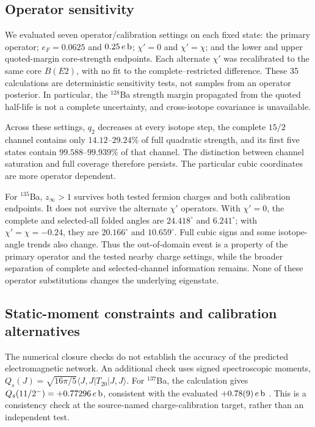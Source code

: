 \subsection{Operator sensitivity}

We evaluated seven operator/calibration settings on each fixed state: the primary operator; $e_F=0.0625$ and $0.25\,e\,{\rm b}$; $\chi'=0$ and $\chi'=\chi$; and the lower and upper quoted-margin core-strength endpoints. Each alternate $\chi'$ was recalibrated to the same core $B(E2)$, with no fit to the complete--restricted difference. These 35 calculations are deterministic sensitivity tests, not samples from an operator posterior. In particular, the $^{128}$Ba strength margin propagated from the quoted half-life is not a complete uncertainty, and cross-isotope covariance is unavailable.

Across these settings, $q_2$ decreases at every isotope step, the complete $15/2$ channel contains only $14.12$--$29.24\%$ of full quadratic strength, and its first five states contain $99.588$--$99.939\%$ of that channel. The distinction between channel saturation and full coverage therefore persists. The particular cubic coordinates are more operator dependent.

For $^{135}$Ba, $z_\infty>1$ survives both tested fermion charges and both calibration endpoints. It does not survive the alternate $\chi'$ operators. With $\chi'=0$, the complete and selected-all folded angles are $24.418^\circ$ and $6.241^\circ$; with $\chi'=\chi=-0.24$, they are $20.166^\circ$ and $10.659^\circ$. Full cubic signs and some isotope-angle trends also change. Thus the out-of-domain event is a property of the primary operator and the tested nearby charge settings, while the broader separation of complete and selected-channel information remains. None of these operator substitutions changes the underlying eigenstate.

\subsection{Static-moment constraints and calibration alternatives}

The numerical closure checks do not establish the accuracy of the predicted
electromagnetic network. An additional check uses signed spectroscopic moments,
$Q_s(J)=\sqrt{16\pi/5}\langle J,J|T_{20}|J,J\rangle$.
For $^{137}$Ba, the calculation gives
$Q_s(11/2^-)=+0.77296\,e\,{\rm b}$, consistent with the evaluated
$+0.78(9)\,e\,{\rm b}$ \cite{ENSDF}. This is a consistency check at the
source-named charge-calibration target, rather than an independent test.

